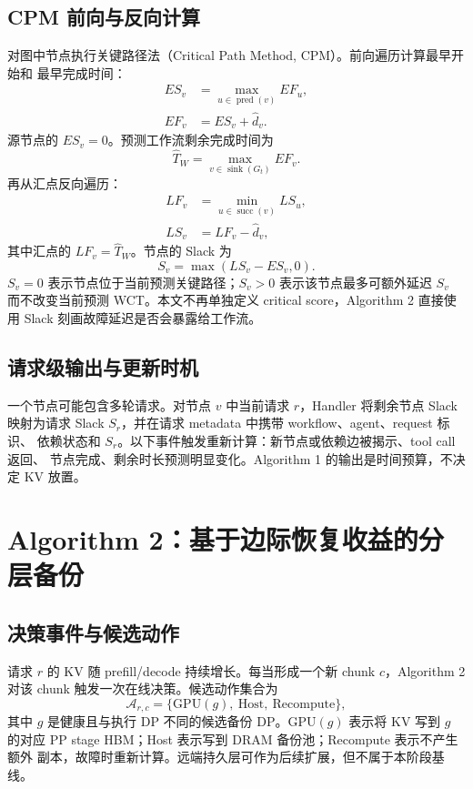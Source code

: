\documentclass[UTF8,11pt,a4paper]{ctexart}
\begin{document}
\subsection{CPM 前向与反向计算}

对图中节点执行关键路径法（Critical Path Method, CPM）。前向遍历计算最早开始和
最早完成时间：
\begin{align}
  ES_v &= \max_{u\in\operatorname{pred}(v)} EF_u, \\
  EF_v &= ES_v+\widehat d_v .
  \label{eq:cpm-forward}
\end{align}
源节点的 $ES_v=0$。预测工作流剩余完成时间为
\begin{equation}
  \widehat T_W=\max_{v\in\operatorname{sink}(G_t)} EF_v .
\end{equation}
再从汇点反向遍历：
\begin{align}
  LF_v &= \min_{u\in\operatorname{succ}(v)} LS_u, \\
  LS_v &= LF_v-\widehat d_v ,
  \label{eq:cpm-backward}
\end{align}
其中汇点的 $LF_v=\widehat T_W$。节点的 Slack 为
\begin{equation}
  S_v=\max(LS_v-ES_v,0).
  \label{eq:node-slack}
\end{equation}
$S_v=0$ 表示节点位于当前预测关键路径；$S_v>0$ 表示该节点最多可额外延迟 $S_v$
而不改变当前预测 WCT。本文不再单独定义 critical score，Algorithm 2 直接使用 Slack
刻画故障延迟是否会暴露给工作流。

\subsection{请求级输出与更新时机}

一个节点可能包含多轮请求。对节点 $v$ 中当前请求 $r$，Handler 将剩余节点 Slack
映射为请求 Slack $S_r$，并在请求 metadata 中携带 workflow、agent、request 标识、
依赖状态和 $S_r$。以下事件触发重新计算：新节点或依赖边被揭示、tool call 返回、
节点完成、剩余时长预测明显变化。Algorithm 1 的输出是时间预算，不决定 KV 放置。

\section{Algorithm 2：基于边际恢复收益的分层备份}

\subsection{决策事件与候选动作}

请求 $r$ 的 KV 随 prefill/decode 持续增长。每当形成一个新 chunk $c$，Algorithm 2
对该 chunk 触发一次在线决策。候选动作集合为
\begin{equation}
  \mathcal A_{r,c}=\{\mathrm{GPU}(g),\ \mathrm{Host},\ \mathrm{Recompute}\},
  \label{eq:actions}
\end{equation}
其中 $g$ 是健康且与执行 DP 不同的候选备份 DP。$\mathrm{GPU}(g)$ 表示将 KV 写到
$g$ 的对应 PP stage HBM；Host 表示写到 DRAM 备份池；Recompute 表示不产生额外
副本，故障时重新计算。远端持久层可作为后续扩展，但不属于本阶段基线。
\end{document}
